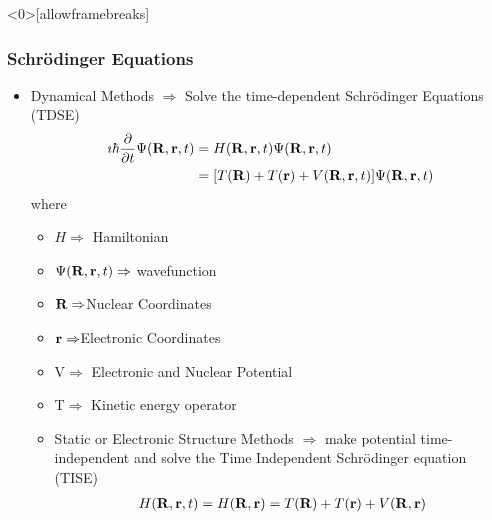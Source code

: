 \documentclass[slidestop,mathserif,compress,xcolor=svgnames]{beamer}
\begin{document}
\begin{frame}<0>[allowframebreaks]
\frametitle{\small Schr\"{o}dinger Equations}
\begin{itemize}
\item Dynamical Methods $\Rightarrow$ Solve the time-dependent Schr\"{o}dinger Equations (TDSE) 
\begin{align*}
\imath\hbar\dfrac{\partial}{\partial t} \Psi({\bf R},{\bf r},t) &= H({\bf R},{\bf r},t)\Psi({\bf R},{\bf r},t)\\
 &= [T({\bf R}) +T({\bf r})+ V({\bf R},{\bf r},t)]\Psi({\bf R},{\bf r},t)
\end{align*}
where
\begin{itemize}
\item $H\Rightarrow$ Hamiltonian
\item $\Psi({\bf R},{\bf r},t)\Rightarrow$ wavefunction
\item ${\bf R}\Rightarrow$Nuclear Coordinates
\item ${\bf r}\Rightarrow$Electronic Coordinates
\item V$\Rightarrow$ Electronic and Nuclear Potential
\item T$\Rightarrow$ Kinetic energy operator
\end{itemize}
\begin{itemize}
\item Static or Electronic Structure Methods $\Rightarrow$ make potential time-independent and solve the Time Independent Schr\"{o}dinger equation (TISE)
\begin{align*}
H({\bf R},{\bf r},t)=H({\bf R},{\bf r}) &= T({\bf R}) + T({\bf r}) + V({\bf R},{\bf r})\\

\end{align*}
\end{itemize}
\end{itemize}
\end{frame}
\end{document}
